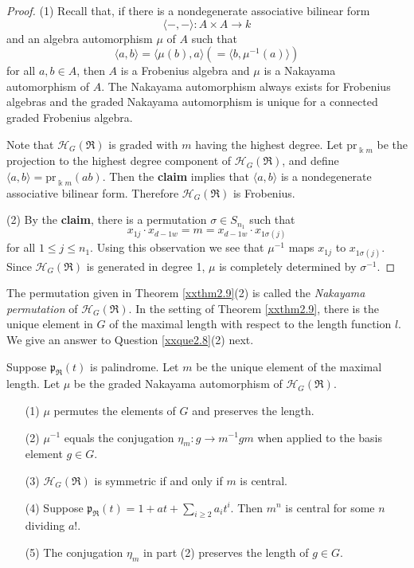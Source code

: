 \begin{proof}
(1) Recall that, if there is a nondegenerate associative bilinear form
$$\langle -, -\rangle: A\times A \to k$$ 
and an algebra automorphism $\mu$ of $A$ 
such that 
$$\langle a,b\rangle=\langle \mu(b), a\rangle(=\langle b, \mu^{-1}(a)\rangle)$$ 
for all $a,b\in A$,
then $A$ is a Frobenius algebra and $\mu$ is a Nakayama automorphism of $A$. 
The Nakayama
automorphism always exists for Frobenius algebras and the 
graded Nakayama automorphism is unique for 
a connected graded Frobenius algebra. 

Note that ${\mathcal H}_G(\Re)$ is graded with $m$ having 
the highest degree. Let ${\text{pr}}_{\Bbbk m}$ be the projection to 
the highest degree component of ${\mathcal H}_G(\Re)$, and define $\langle a,b\rangle={\text{pr}}_{\Bbbk m}(ab)$.
Then the {\bf claim} implies that $\langle a,b\rangle$ is a nondegenerate
associative bilinear form. Therefore ${\mathcal H}_G(\Re)$ is Frobenius.

(2) 
By the {\bf claim}, there is a permutation $\sigma\in S_{n_1}$ such that
\begin{equation}
\label{E2.9.1}\tag{E2.9.1}
x_{1j} \cdot x_{d-1 w}=m =x_{d-1 w} \cdot x_{1\sigma(j)}
\end{equation}
for all $1\leq j\leq n_1$. Using this observation we see  that 
$\mu^{-1}$ maps $x_{1j}$ to $x_{1\sigma(j)}$. Since
${\mathcal H}_G(\Re)$ is generated in degree 1, $\mu$ 
is completely determined by
$\sigma^{-1}$.
\end{proof}

The permutation given in Theorem \ref{xxthm2.9}(2) 
is called the {\it Nakayama permutation} of ${\mathcal H}_G(\Re)$.
In the setting of Theorem \ref{xxthm2.9}, there is the unique element 
in $G$ of the maximal length with respect to the length function $l$. 
We give an answer to Question \ref{xxque2.8}(2) next.

\begin{theorem}
\label{xxthm2.10} Suppose ${\mathfrak{p}}_\Re(t)$ is palindrome. 
Let $m$ be the unique element of the maximal length. 
Let $\mu$ be the graded Nakayama automorphism of 
${\mathcal H}_G(\Re)$.
\begin{enumerate}
\item[(1)]
$\mu$ permutes the elements of $G$ and preserves 
the length.
\item[(2)]
$\mu^{-1}$ equals the conjugation $\eta_{m}: g\to m^{-1} g m$
when applied to the basis element $g\in G$.
\item[(3)]
${\mathcal H}_G(\Re)$ is symmetric if and only if $m$ is central.
\item[(4)]
Suppose ${\mathfrak{p}}_\Re(t)=1+a t+ \sum_{i\geq 2} a_i t^i$. Then 
$m^n$ is central for some $n$ dividing $a!$.
\item[(5)] 
The conjugation $\eta_{m}$ in part {\rm{(2)}} preserves the length of 
$g\in G$.
\end{enumerate}
\end{theorem}

